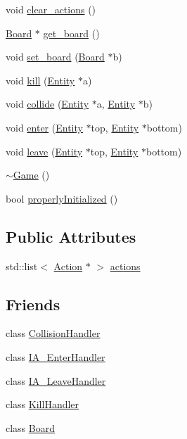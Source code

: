 \begin{DoxyCompactItemize}
\item 
void \hyperlink{class_game_aeab39f9bf569d983f6163add6706ad82}{clear\-\_\-actions} ()
\item 
\hyperlink{class_board}{Board} $\ast$ \hyperlink{class_game_a6f66f42cdc7be06668ac60bff23db9d9}{get\-\_\-board} ()
\item 
void \hyperlink{class_game_ac164df696f1b71acc6246a08e8066b70}{set\-\_\-board} (\hyperlink{class_board}{Board} $\ast$b)
\item 
void \hyperlink{class_game_ad37c165fa3af0658bec23511f57785db}{kill} (\hyperlink{class_entity}{Entity} $\ast$a)
\item 
void \hyperlink{class_game_a3eca6db94a95d5fa843ba69a142a62bb}{collide} (\hyperlink{class_entity}{Entity} $\ast$a, \hyperlink{class_entity}{Entity} $\ast$b)
\item 
void \hyperlink{class_game_a0cc9604134dde3c5e80cebdc97a270e1}{enter} (\hyperlink{class_entity}{Entity} $\ast$top, \hyperlink{class_entity}{Entity} $\ast$bottom)
\item 
void \hyperlink{class_game_a737c0a9f00bccef6f3e8e743a2f8bea1}{leave} (\hyperlink{class_entity}{Entity} $\ast$top, \hyperlink{class_entity}{Entity} $\ast$bottom)
\item 
\hyperlink{class_game_ae3d112ca6e0e55150d2fdbc704474530}{$\sim$\-Game} ()
\item 
bool \hyperlink{class_game_a7a97d89e85982b7d67d13e0c502de6a2}{properly\-Initialized} ()
\end{DoxyCompactItemize}
\subsection*{Public Attributes}
\begin{DoxyCompactItemize}
\item 
std\-::list$<$ \hyperlink{class_action}{Action} $\ast$ $>$ \hyperlink{class_game_a8e61c60693aa39b8a3deb5f3f277b43f}{actions}
\end{DoxyCompactItemize}
\subsection*{Friends}
\begin{DoxyCompactItemize}
\item 
class \hyperlink{class_game_ab0955901615f29e137d1ad6b95fc2c55}{Collision\-Handler}
\item 
class \hyperlink{class_game_ad46435fe6b8e9a384d33d608058862ae}{I\-A\-\_\-\-Enter\-Handler}
\item 
class \hyperlink{class_game_adc4c20007ad2fd4bc2556fbfbff54945}{I\-A\-\_\-\-Leave\-Handler}
\item 
class \hyperlink{class_game_aab5a016b7fd0a16c4e689d3102ec3a17}{Kill\-Handler}
\item 
class \hyperlink{class_game_a12525b6ed7c8186be0bee5cf78e2a49c}{Board}
\end{DoxyCompactItemize}


